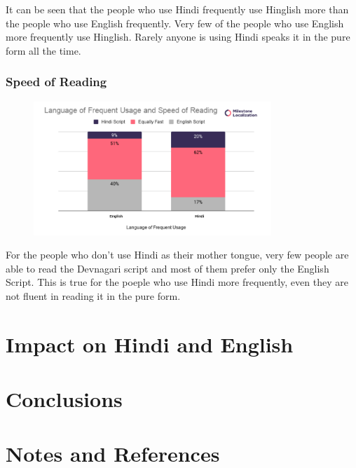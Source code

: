 \documentclass{article}
\begin{document}
It can be seen that the people who use Hindi frequently use Hinglish more than the people who use English frequently. Very few of the people who use English more frequently use Hinglish. Rarely anyone is using Hindi speaks it in the pure form all the time. 

\subsubsection{Speed of Reading}

\begin{figure}[H]
    \centering
    \includegraphics[width=0.8\textwidth]{plots/frequent_faster_read.png}
\end{figure}

For the people who don't use Hindi as their mother tongue, very few people are able to read the Devnagari script and most of them prefer only the English Script. This is true for the poeple who use Hindi more frequently, even they are not fluent in reading it in the pure form.

\section{Impact on Hindi and English}


\section{Conclusions}

\section{Notes and References}
\end{document}
